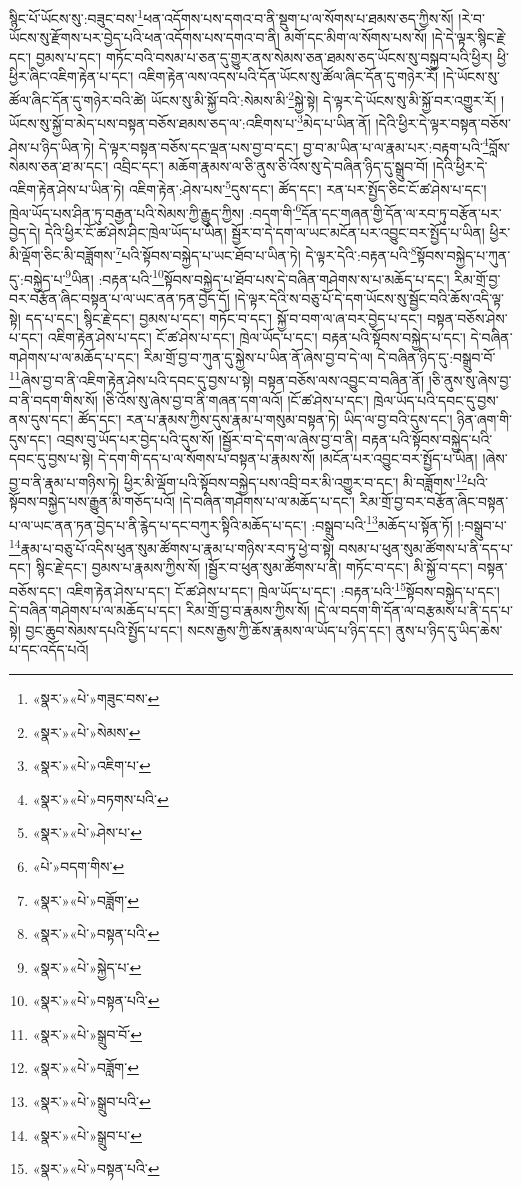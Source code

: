སྙིང་པོ་ཡོངས་སུ་:བཟུང་བས་\footnote{«སྣར་»«པེ་»གཟུང་བས་}ཕན་འདོགས་པས་དགའ་བ་ནི་སྡུག་པ་ལ་སོགས་པ་ཐམས་ཅད་ཀྱིས་སོ། །རེ་བ་ཡོངས་སུ་རྫོགས་པར་བྱེད་པའི་ཕན་འདོགས་པས་དགའ་བ་ནི། མགོ་དང་མིག་ལ་སོགས་པས་སོ། །དེ་དེ་ལྟར་སྙིང་རྗེ་དང་། བྱམས་པ་དང་། གཏོང་བའི་བསམ་པ་ཅན་དུ་གྱུར་ནས་སེམས་ཅན་ཐམས་ཅད་ཡོངས་སུ་བསྐྱབ་པའི་ཕྱིར། ཕྱི་ཕྱིར་ཞིང་འཇིག་རྟེན་པ་དང་། འཇིག་རྟེན་ལས་འདས་པའི་དོན་ཡོངས་སུ་ཚོལ་ཞིང་དོན་དུ་གཉེར་རོ། །དེ་ཡོངས་སུ་ཚོལ་ཞིང་དོན་དུ་གཉེར་བའི་ཚེ། ཡོངས་སུ་མི་སྐྱོ་བའི་:སེམས་མི་\footnote{«སྣར་»«པེ་»སེམས་}སྐྱེ་སྟེ། དེ་ལྟར་དེ་ཡོངས་སུ་མི་སྐྱོ་བར་འགྱུར་རོ། །ཡོངས་སུ་སྐྱོ་བ་མེད་པས་བསྟན་བཅོས་ཐམས་ཅད་ལ་:འཇིགས་པ་\footnote{«སྣར་»«པེ་»འཇིག་པ་}མེད་པ་ཡིན་ནོ། །དེའི་ཕྱིར་དེ་ལྟར་བསྟན་བཅོས་ཤེས་པ་ཉིད་ཡིན་ཏེ། དེ་ལྟར་བསྟན་བཅོས་དང་ལྡན་པས་བྱ་བ་དང་། བྱ་བ་མ་ཡིན་པ་ལ་རྣམ་པར་:བརྟག་པའི་\footnote{«སྣར་»«པེ་»བཏགས་པའི་}བློས་སེམས་ཅན་ཐ་མ་དང་། འབྲིང་དང་། མཆོག་རྣམས་ལ་ཅི་ནུས་ཅི་འོས་སུ་དེ་བཞིན་ཉིད་དུ་སྒྲུབ་བོ། །དེའི་ཕྱིར་དེ་འཇིག་རྟེན་ཤེས་པ་ཡིན་ཏེ། འཇིག་རྟེན་:ཤེས་པས་\footnote{«སྣར་»«པེ་»ཤེས་པ་}དུས་དང་། ཚོད་དང་། རན་པར་སྤྱོད་ཅིང་ངོ་ཚ་ཤེས་པ་དང་། ཁྲེལ་ཡོད་པས་ཤིན་ཏུ་བརྒྱན་པའི་སེམས་ཀྱི་རྒྱུད་ཀྱིས། :བདག་གི་\footnote{«པེ་»བདག་གིས་}དོན་དང་གཞན་གྱི་དོན་ལ་རབ་ཏུ་བརྩོན་པར་བྱེད་དེ། དེའི་ཕྱིར་ངོ་ཚ་ཤེས་ཤིང་ཁྲེལ་ཡོད་པ་ཡིན། སྦྱོར་བ་དེ་དག་ལ་ཡང་མངོན་པར་འབྱུང་བར་སྤྱོད་པ་ཡིན། ཕྱིར་མི་ལྡོག་ཅིང་མི་བཟློགས་\footnote{«སྣར་»«པེ་»བཟློག་}པའི་སྟོབས་བསྐྱེད་པ་ཡང་ཐོབ་པ་ཡིན་ཏེ། དེ་ལྟར་དེའི་:བརྟན་པའི་\footnote{«སྣར་»«པེ་»བསྟན་པའི་}སྟོབས་བསྐྱེད་པ་ཀུན་དུ་:བསྐྱེད་པ་\footnote{«སྣར་»«པེ་»སྐྱེད་པ་}ཡིན། :བརྟན་པའི་\footnote{«སྣར་»«པེ་»བསྟན་པའི་}སྟོབས་བསྐྱེད་པ་ཐོབ་པས་དེ་བཞིན་གཤེགས་ས་པ་མཆོད་པ་དང་། རིམ་གྲོ་བྱ་བར་བརྩོན་ཞིང་བསྟན་པ་ལ་ཡང་ནན་ཏན་བྱེད་དོ། །དེ་ལྟར་དེའི་ས་བཅུ་པོ་དེ་དག་ཡོངས་སུ་སྦྱོང་བའི་ཆོས་འདི་ལྟ་སྟེ། དད་པ་དང་། སྙིང་རྗེ་དང་། བྱམས་པ་དང་། གཏོང་བ་དང་། སྐྱོ་བ་བག་ལ་ཞ་བར་བྱེད་པ་དང་། བསྟན་བཅོས་ཤེས་པ་དང་། འཇིག་རྟེན་ཤེས་པ་དང་། ངོ་ཚ་ཤེས་པ་དང་། ཁྲེལ་ཡོད་པ་དང་། བརྟན་པའི་སྟོབས་བསྐྱེད་པ་དང་། དེ་བཞིན་གཤེགས་པ་ལ་མཆོད་པ་དང་། རིམ་གྲོ་བྱ་བ་ཀུན་དུ་སྐྱེས་པ་ཡིན་ནོ་ཞེས་བྱ་བ་དེ་ལ། དེ་བཞིན་ཉིད་དུ་:བསྒྲུབ་བོ་\footnote{«སྣར་»«པེ་»སྒྲུབ་བོ་}ཞེས་བྱ་བ་ནི་འཇིག་རྟེན་ཤེས་པའི་དབང་དུ་བྱས་པ་སྟེ། བསྟན་བཅོས་ལས་འབྱུང་བ་བཞིན་ནོ། །ཅི་ནུས་སུ་ཞེས་བྱ་བ་ནི་བདག་གིས་སོ། །ཅི་འོས་སུ་ཞེས་བྱ་བ་ནི་གཞན་དག་ལའོ། །ངོ་ཚ་ཤེས་པ་དང་། ཁྲེལ་ཡོད་པའི་དབང་དུ་བྱས་ནས་དུས་དང་། ཚོད་དང་། རན་པ་རྣམས་ཀྱིས་དུས་རྣམ་པ་གསུམ་བསྟན་ཏེ། ཡིད་ལ་བྱ་བའི་དུས་དང་། ཉིན་ཞག་གི་དུས་དང་། འབྲས་བུ་ཡོད་པར་བྱེད་པའི་དུས་སོ། །སྦྱོར་བ་དེ་དག་ལ་ཞེས་བྱ་བ་ནི། བརྟན་པའི་སྟོབས་བསྐྱེད་པའི་དབང་དུ་བྱས་པ་སྟེ། དེ་དག་གི་དད་པ་ལ་སོགས་པ་བསྟན་པ་རྣམས་སོ། །མངོན་པར་འབྱུང་བར་སྤྱོད་པ་ཡིན། །ཞེས་བྱ་བ་ནི་རྣམ་པ་གཉིས་ཏེ། ཕྱིར་མི་ལྡོག་པའི་སྟོབས་བསྐྱེད་པས་འབྲི་བར་མི་འགྱུར་བ་དང་། མི་བཟློགས་\footnote{«སྣར་»«པེ་»བཟློག་}པའི་སྟོབས་བསྐྱེད་པས་རྒྱུན་མི་གཅོད་པའོ། །དེ་བཞིན་གཤེགས་པ་ལ་མཆོད་པ་དང་། རིམ་གྲོ་བྱ་བར་བརྩོན་ཞིང་བསྟན་པ་ལ་ཡང་ནན་ཏན་བྱེད་པ་ནི་རྙེད་པ་དང་བཀུར་སྟིའི་མཆོད་པ་དང་། :བསྒྲུབ་པའི་\footnote{«སྣར་»«པེ་»སྒྲུབ་པའི་}མཆོད་པ་སྟོན་ཏོ། །:བསྒྲུབ་པ་\footnote{«སྣར་»«པེ་»སྒྲུབ་པ་}རྣམ་པ་བཅུ་པོ་འདིས་ཕུན་སུམ་ཚོགས་པ་རྣམ་པ་གཉིས་རབ་ཏུ་ཕྱེ་བ་སྟེ། བསམ་པ་ཕུན་སུམ་ཚོགས་པ་ནི་དད་པ་དང་། སྙིང་རྗེ་དང་། བྱམས་པ་རྣམས་ཀྱིས་སོ། །སྦྱོར་བ་ཕུན་སུམ་ཚོགས་པ་ནི། གཏོང་བ་དང་། མི་སྐྱོ་བ་དང་། བསྟན་བཅོས་དང་། འཇིག་རྟེན་ཤེས་པ་དང་། ངོ་ཚ་ཤེས་པ་དང་། ཁྲེལ་ཡོད་པ་དང་། :བརྟན་པའི་\footnote{«སྣར་»«པེ་»བསྟན་པའི་}སྟོབས་བསྐྱེད་པ་དང་། དེ་བཞིན་གཤེགས་པ་ལ་མཆོད་པ་དང་། རིམ་གྲོ་བྱ་བ་རྣམས་ཀྱིས་སོ། །དེ་ལ་བདག་གི་དོན་ལ་བརྩམས་པ་ནི་དད་པ་སྟེ། བྱང་ཆུབ་སེམས་དཔའི་སྤྱོད་པ་དང་། སངས་རྒྱས་ཀྱི་ཆོས་རྣམས་ལ་ཡོད་པ་ཉིད་དང་། ནུས་པ་ཉིད་དུ་ཡིད་ཆེས་པ་དང་འདོད་པའོ། 
